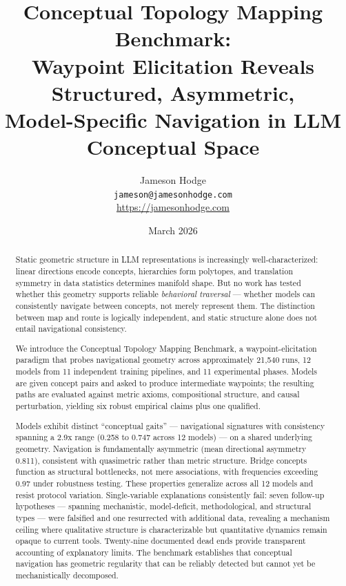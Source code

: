 \documentclass[11pt]{article}
\title{Conceptual Topology Mapping Benchmark:\\
  Waypoint Elicitation Reveals Structured, Asymmetric,\\
  Model-Specific Navigation in LLM Conceptual Space}
\author{Jameson Hodge\\
  \texttt{jameson@jamesonhodge.com}\\
  \url{https://jamesonhodge.com}}
\date{March 2026}
\begin{document}
\maketitle

\begin{abstract}
Static geometric structure in LLM representations is increasingly well-characterized: linear directions encode concepts, hierarchies form polytopes, and translation symmetry in data statistics determines manifold shape. But no work has tested whether this geometry supports reliable \emph{behavioral traversal} --- whether models can consistently navigate between concepts, not merely represent them. The distinction between map and route is logically independent, and static structure alone does not entail navigational consistency.

We introduce the Conceptual Topology Mapping Benchmark, a waypoint-elicitation paradigm that probes navigational geometry across approximately 21,540 runs, 12 models from 11 independent training pipelines, and 11 experimental phases. Models are given concept pairs and asked to produce intermediate waypoints; the resulting paths are evaluated against metric axioms, compositional structure, and causal perturbation, yielding six robust empirical claims plus one qualified.

Models exhibit distinct ``conceptual gaits'' --- navigational signatures with consistency spanning a 2.9x range (0.258 to 0.747 across 12 models) --- on a shared underlying geometry. Navigation is fundamentally asymmetric (mean directional asymmetry 0.811), consistent with quasimetric rather than metric structure. Bridge concepts function as structural bottlenecks, not mere associations, with frequencies exceeding 0.97 under robustness testing. These properties generalize across all 12 models and resist protocol variation. Single-variable explanations consistently fail: seven follow-up hypotheses --- spanning mechanistic, model-deficit, methodological, and structural types --- were falsified and one resurrected with additional data, revealing a mechanism ceiling where qualitative structure is characterizable but quantitative dynamics remain opaque to current tools. Twenty-nine documented dead ends provide transparent accounting of explanatory limits. The benchmark establishes that conceptual navigation has geometric regularity that can be reliably detected but cannot yet be mechanistically decomposed.
\end{abstract}

\end{document}
